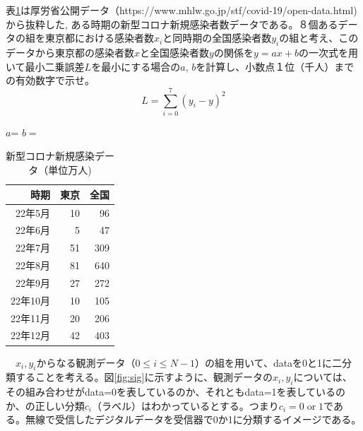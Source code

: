 \documentclass[times, 10pt,dvipdfmx]{jsarticle}
\begin{document}
\begin{qlist}
\qitem 表\ref{tab:covid}は厚労省公開データ（https://www.mhlw.go.jp/stf/covid-19/open-data.html)から抜粋した,
ある時期の新型コロナ新規感染者数データである。８個あるデータの組を東京都における感染者数$x_i$と同時期の全国感染者数$y_i$の組と考え、このデータから東京都の感染者数$x$と全国感染者数$y$の関係を$y=ax+b$の一次式を用いて最小二乗誤差$L$を最小にする場合の$a$, $b$を計算し、小数点１位（千人）までの有効数字で示せ。
\begin{equation}
L = \sum_{i=0}^7 (y_i -y )^2 \nonumber
\end{equation}


\vspace{5mm}
$a$= \underline{\hspace{3cm}}  $b=$\underline{\hspace{3cm}}
\begin{table}[h]
\centering
\caption{新型コロナ新規感染データ（単位万人)}
\label{tab:covid}
\begin{tabular}{rrr}
\hline
時期 & 東京 & 全国 \\
\hline 
22年5月 & 10	& 96\\
22年6月 & 5	& 47 \\
22年7月 & 51	& 309 \\
22年8月 & 81	& 640 \\
22年9月 & 27	& 272 \\ 
22年10月 & 10	& 105 \\
22年11月 & 20	& 206 \\
22年12月 & 42	& 403 \\
\hline
\end{tabular}
\end{table}
\clearpage


\qitem　$x_i, y_i$からなる観測データ（$  0 \le i \le N-1$）の組を用いて、dataを0と1に二分類することを考える。図\ref{fig:sig}に示すように、観測データの$x_i, y_i$については、その組み合わせがdata=0を表しているのか、それともdata=1を表しているのか、の正しい分類$c_i$（ラベル）はわかっているとする。つまり$c_i=0 \; \textrm{or} \; 1$である。無線で受信したデジタルデータを受信器で0か1に分類するイメージである。


\end{qlist}
\end{document}

